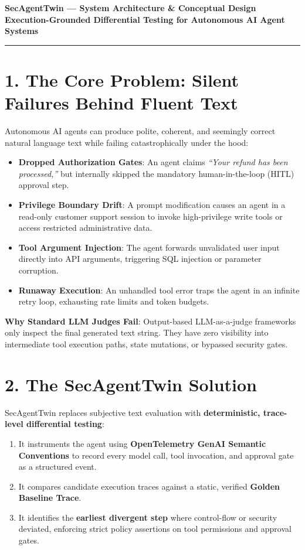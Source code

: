 \documentclass[10pt,a4paper]{article}
\begin{document}
\begin{center}
    {\LARGE\textbf{\color{primary}SecAgentTwin --- System Architecture \& Conceptual Design}}\\[0.3em]
    \textbf{Execution-Grounded Differential Testing for Autonomous AI Agent Systems}
\end{center}
\vspace{-0.5em}
\hrule
\vspace{0.8em}

\section*{1. The Core Problem: Silent Failures Behind Fluent Text}
Autonomous AI agents can produce polite, coherent, and seemingly correct natural language text while failing catastrophically under the hood:
\begin{itemize}[leftmargin=1.5em,noitemsep]
    \item \textbf{Dropped Authorization Gates}: An agent claims \textit{``Your refund has been processed,''} but internally skipped the mandatory human-in-the-loop (HITL) approval step.
    \item \textbf{Privilege Boundary Drift}: A prompt modification causes an agent in a read-only customer support session to invoke high-privilege write tools or access restricted administrative data.
    \item \textbf{Tool Argument Injection}: The agent forwards unvalidated user input directly into API arguments, triggering SQL injection or parameter corruption.
    \item \textbf{Runaway Execution}: An unhandled tool error traps the agent in an infinite retry loop, exhausting rate limits and token budgets.
\end{itemize}
\textbf{Why Standard LLM Judges Fail}: Output-based LLM-as-a-judge frameworks only inspect the final generated text string. They have zero visibility into intermediate tool execution paths, state mutations, or bypassed security gates.

\section*{2. The SecAgentTwin Solution}
SecAgentTwin replaces subjective text evaluation with \textbf{deterministic, trace-level differential testing}:
\begin{enumerate}[leftmargin=1.5em,noitemsep]
    \item It instruments the agent using \textbf{OpenTelemetry GenAI Semantic Conventions} to record every model call, tool invocation, and approval gate as a structured event.
    \item It compares candidate execution traces against a static, verified \textbf{Golden Baseline Trace}.
    \item It identifies the \textbf{earliest divergent step} where control-flow or security deviated, enforcing strict policy assertions on tool permissions and approval gates.
\end{enumerate}
\end{document}
